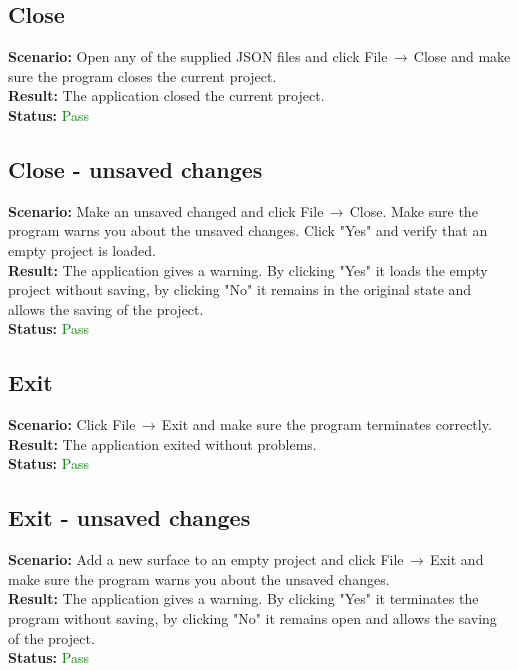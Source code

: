 \documentclass[a4paper, 11pt, article]{report}
\begin{document}
\subsection{Close}

\noindent \textbf{Scenario:} Open any of the supplied JSON files and click File$\,\to\,$Close and make sure the program closes the current project. 
\\
\noindent \textbf{Result:} The application closed the current project.
\\
\noindent \textbf{Status:} \textcolor{green}{Pass}

\subsection{Close - unsaved changes}

\noindent \textbf{Scenario:} Make an unsaved changed and click File$\,\to\,$Close. Make sure the program warns you about the unsaved changes. Click "Yes" and verify that an empty project is loaded.
\\
\noindent \textbf{Result:} The application gives a warning. By clicking "Yes" it loads the empty project without saving, by clicking "No" it remains in the original state and allows the saving of the project.
\\
\noindent \textbf{Status:} \textcolor{green}{Pass}

\subsection{Exit}

\noindent \textbf{Scenario:} Click File$\,\to\,$Exit and make sure the program terminates correctly.
\\
\noindent \textbf{Result:} The application exited without problems.
\\
\noindent \textbf{Status:} \textcolor{green}{Pass}

\subsection{Exit - unsaved changes}

\noindent \textbf{Scenario:} Add a new surface to an empty project and click File$\,\to\,$Exit and make sure the program warns you about the unsaved changes.
\\
\noindent \textbf{Result:} The application gives a warning. By clicking "Yes" it terminates the program without saving, by clicking "No" it remains open and allows the saving of the project.
\\
\noindent \textbf{Status:} \textcolor{green}{Pass}
\end{document}
